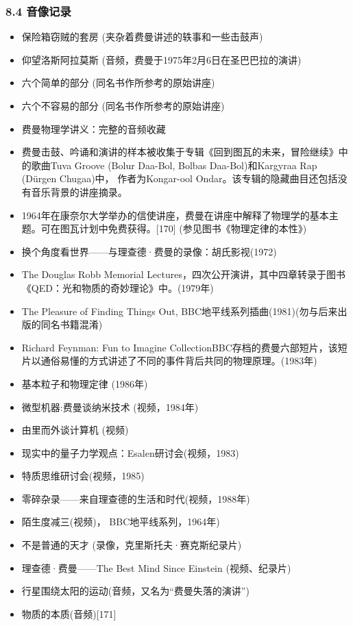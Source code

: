 \subsubsection{8.4 音像记录}
\begin{itemize}
\item 保险箱窃贼的套房 (夹杂着费曼讲述的轶事和一些击鼓声)
\item 仰望洛斯阿拉莫斯 (音频，费曼于1975年2月6日在圣巴巴拉的演讲)
\item 六个简单的部分 (同名书作所参考的原始讲座)
\item 六个不容易的部分 (同名书作所参考的原始讲座)
\item 费曼物理学讲义：完整的音频收藏
\item 费曼击鼓、吟诵和演讲的样本被收集于专辑《回到图瓦的未来，冒险继续》中的歌曲Tuva Groove (Bolur Daa-Bol, Bolbas Daa-Bol)和Kargyraa Rap (Dürgen Chugaa)中， 作者为Kongar-ool Ondar。该专辑的隐藏曲目还包括没有音乐背景的讲座摘录。
\item 1964年在康奈尔大学举办的信使讲座，费曼在讲座中解释了物理学的基本主题。可在图瓦计划中免费获得。[170] (参见图书《物理定律的本性》)
\item 换个角度看世界——与理查德·费曼的录像：胡氏影视(1972)
\item The Douglas Robb Memorial Lectures，四次公开演讲，其中四章转录于图书《QED：光和物质的奇妙理论》中。(1979年)
\item The Pleasure of Finding Things Out, BBC地平线系列插曲(1981)(勿与后来出版的同名书籍混淆)
\item Richard Feynman: Fun to Imagine CollectionBBC存档的费曼六部短片，该短片以通俗易懂的方式讲述了不同的事件背后共同的物理原理。(1983年)
\item 基本粒子和物理定律 (1986年)
\item 微型机器:费曼谈纳米技术 (视频，1984年)
\item 由里而外谈计算机 (视频)
\item 现实中的量子力学观点：Esalen研讨会(视频，1983)
\item 特质思维研讨会(视频，1985)
\item 零碎杂录——来自理查德的生活和时代(视频，1988年)
\item 陌生度减三(视频)， BBC地平线系列，1964年)
\item 不是普通的天才 (录像，克里斯托夫·赛克斯纪录片)
\item 理查德·费曼——The Best Mind Since Einstein (视频、纪录片)
\item 行星围绕太阳的运动(音频，又名为“费曼失落的演讲”)
\item 物质的本质(音频)[171]
\end{itemize}

